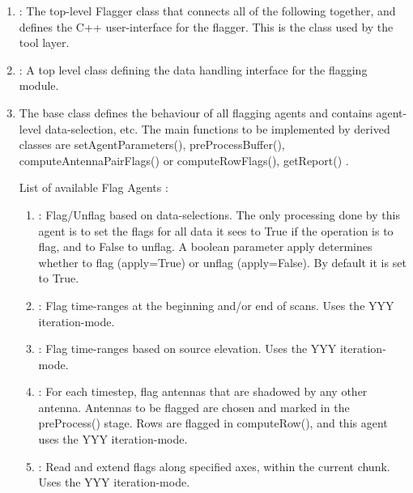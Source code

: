 \begin{enumerate}
\item
{}:
The top-level Flagger class that connects all of the following together, and defines the C++ user-interface for the flagger.  This is the class used by the tool layer.

\item {} : A top level class defining the data handling interface for the flagging module. 

\item The   base class defines the behaviour of all flagging agents
and contains agent-level data-selection, etc.  The main functions to be implemented by derived classes are
setAgentParameters(), preProcessBuffer(), computeAntennaPairFlags() or computeRowFlags(), getReport() . 

List of available Flag Agents : 
\begin{enumerate}
\item {} :  Flag/Unflag based on data-selections.  
The only processing done by this agent is to set the flags for all data it sees to 
True if the operation is to flag, and to False to unflag. A boolean parameter
apply determines whether to flag (apply=True) or unflag (apply=False). By
default it is set to True.

\item {} :  Flag time-ranges at the beginning and/or end of scans. 
Uses the YYY iteration-mode. 

\item {} : Flag time-ranges based on source elevation. 
Uses the YYY iteration-mode.

\item {} : For each timestep, flag antennas that are shadowed by
any other antenna.  Antennas to be flagged are chosen and marked in the preProcess() stage.
Rows are flagged in computeRow(), and this agent uses the YYY iteration-mode.

\item {} : Read and extend flags along specified axes, within the
current chunk.  Uses the YYY iteration-mode.


\end{enumerate}
\end{enumerate}
